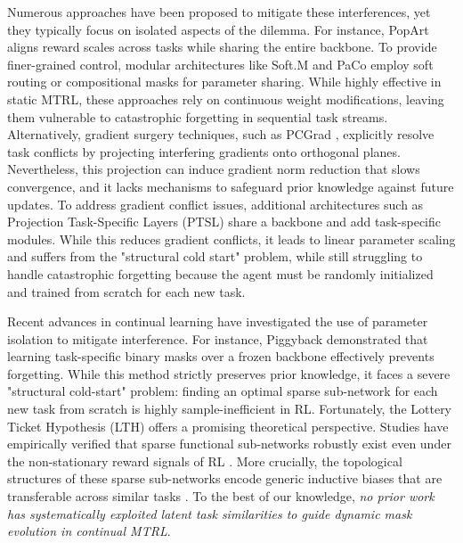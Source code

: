 \documentclass{article}
\begin{document}
Numerous approaches have been proposed to mitigate these interferences, yet they typically focus on isolated aspects of the dilemma. 
For instance, PopArt \cite{q12} aligns reward scales across tasks while sharing the entire backbone. 
To provide finer-grained control, modular architectures like Soft.M \cite{q51} and PaCo \cite{q36} employ soft routing or compositional masks for parameter sharing.
While highly effective in static MTRL, these approaches rely on continuous weight modifications, leaving them vulnerable to catastrophic forgetting in sequential task streams. 
Alternatively, gradient surgery techniques, such as PCGrad \cite{i14}, explicitly resolve task conflicts by projecting interfering gradients onto orthogonal planes. Nevertheless, this projection can induce gradient norm reduction that slows convergence, and it lacks mechanisms to safeguard prior knowledge against future updates. 
To address gradient conflict issues, additional architectures such as Projection Task-Specific Layers (PTSL)\cite{q43} share a backbone and add task-specific modules.
While this reduces gradient conflicts, it leads to linear parameter scaling and suffers from the "structural cold start" problem, while still struggling to handle catastrophic forgetting because the agent must be randomly initialized and trained from scratch for each new task.


Recent advances in continual learning have investigated the use of parameter isolation to mitigate interference.
For instance, Piggyback \cite{i13} demonstrated that learning task-specific binary masks over a frozen backbone effectively prevents forgetting.
While this method strictly preserves prior knowledge, it faces a severe "structural cold-start" problem: finding an optimal sparse sub-network for each new task from scratch is highly sample-inefficient in RL.
Fortunately, the Lottery Ticket Hypothesis (LTH) \cite{n1} offers a promising theoretical perspective.
Studies have empirically verified that sparse functional sub-networks robustly exist even under the non-stationary reward signals of RL \cite{n2}.
More crucially, the topological structures of these sparse sub-networks encode generic inductive biases that are transferable across similar tasks \cite{n3}.
To the best of our knowledge, \emph{no prior work has systematically exploited latent task similarities to guide dynamic mask evolution in continual MTRL}.
\end{document}
